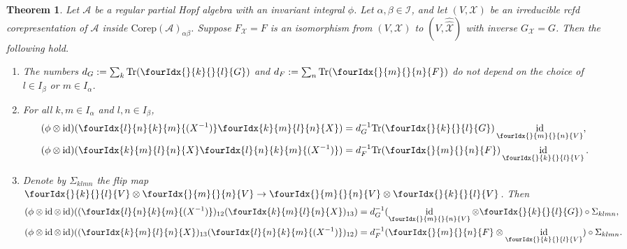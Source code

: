 \documentclass[10pt]{article}
\DeclareMathOperator{\id}{id}
\newcommand{\Corep}{\mathrm{Corep}}
\newcommand{\Tr}{\mathrm{Tr}}
\newcommand{\Gr}[5]{\fourIdx{#2}{#4}{#3}{#5}{#1}}%
\newcommand{\Gru}[3]{\Gr{#1}{}{}{#2}{#3}}
\newtheorem{Theorem}{Theorem}[section]
\theoremstyle{definition}
\numberwithin{equation}{section}
\begin{document}
\begin{Theorem} \label{thm:rep-orthogonality} Let $\mathcal{A}$ be a
  regular partial Hopf algebra with an invariant integral $\phi$. Let $\alpha,\beta\in \mathscr{I}$, and let $(V,\mathscr{X})$
  be an irreducible rcfd corepresentation of $\mathscr{A}$ inside $\Corep(\mathscr{A})_{\alpha\beta}$. Suppose
  $F_{\mathscr{X}}=F$ is an isomorphism from $(V,\mathscr{X})$ to
  $(V,\hat{\hat{\mathscr{X}}})$ with inverse
  $G_{\mathscr{X}}= G$. Then the following hold.
  \begin{enumerate}[label=(\arabic*)]
  \item The numbers $d_G:=\sum_{k} \Tr (\Gru{G}{k}{l})$ and $d_F:=\sum_{n} \Tr (\Gru{F}{m}{n})$ do not depend on the choice of $l \in I_\beta$ or $m\in I_\alpha$.
    \item  For all $k,m \in I_\alpha$ and $l,n\in I_\beta$,
    \begin{align*}
      (\phi \otimes \id)(\Gr{(X^{-1})}{l}{k}{n}{m}\Gr{X}{k}{l}{m}{n})
      &=d_G^{-1}\Tr(\Gru{G}{k}{l})
      \id_{\Gru{V}{m}{n}}, \\
      (\phi \otimes \id)(\Gr{X}{k}{l}{m}{n}\Gr{(X^{-1})}{l}{k}{n}{m})
      &=d_F^{-1}\Tr(\Gru{F}{m}{n})
      \id_{\Gru{V}{k}{l}}.
    \end{align*}
  \item Denote by $\Sigma_{klmn}$ the flip map $\Gru{V}{k}{l}
    \otimes \Gru{V}{m}{n} \to \Gru{V}{m}{n}
    \otimes \Gru{V}{k}{l}$. Then
 \begin{align*}
   (\phi \otimes \id \otimes
   \id)((\Gr{(X^{-1})}{l}{k}{n}{m})_{12}(\Gr{X}{k}{l}{m}{n})_{13}) &=
   d_G^{-1}
   (\id_{\Gru{V}{m}{n}} \otimes \Gru{G}{k}{l})
   \circ \Sigma_{klmn}, \\
   (\phi \otimes \id \otimes
   \id)((\Gr{X}{k}{l}{m}{n})_{13}(\Gr{(X^{-1})}{l}{k}{n}{m})_{12}) &= d_F^{-1} (\Gru{F}{m}{n}
   \otimes \id_{\Gru{V}{k}{l}}) \circ \Sigma_{klmn}.
 \end{align*}
\end{enumerate}
  \end{Theorem}
\end{document}
